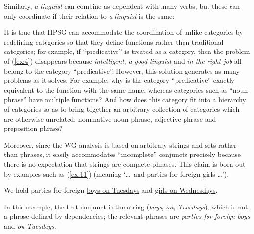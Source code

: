 \documentclass[output=paper]{langscibook}
\begin{document}
\begin{exe}
	\label{ex:5}

	\label{ex:6}

	\label{ex:7}
\end{exe}

Similarly, \emph{a linguist} can combine as dependent with many verbs, but these can only coordinate if their relation to \emph{a linguist} is the same:

\begin{exe}
	\label{ex:8}

	\label{ex:9}

	\label{ex:10}
\end{exe}

It is true that HPSG can accommodate the coordination of unlike categories by redefining categories so that they define functions rather than traditional categories; for example, if ``predicative'' is treated as a category, then the problem of (\ref{ex:4}) disappears because \emph{intelligent}, \emph{a good linguist} and \emph{in the right job} all belong to the category ``predicative''. However, this solution generates as many problems as it solves. For example, why is the category ``predicative'' exactly equivalent to the function with the same name, whereas categories such as ``noun phrase'' have multiple functions? And how does this category fit into a hierarchy of categories so as to bring together an arbitrary collection of categories which are otherwise unrelated: nominative noun phrase, adjective phrase and preposition phrase?

Moreover, since the WG analysis is based on arbitrary strings and sets rather than phrases, it easily accommodates ``incomplete'' conjuncts \citep[405]{Hudson90a-u} \citep{Hudson1982} precisely because there is no expectation that strings are complete phrases. This claim is born out by examples such as (\ref{ex:11}) (meaning ‘\dots\ and parties for foreign girls \dots’).

\begin{exe}
	\ex \label{ex:11} We hold parties for foreign \underline{boys on Tuesdays} and \underline{girls on Wednesdays}.
\end{exe}

In this example, the first conjunct is the string (\emph{boys}, \emph{on}, \emph{Tuesdays}), which is not a phrase defined by dependencies; the relevant phrases are \emph{parties for foreign boys} and \emph{on Tuesdays}.
\end{document}
